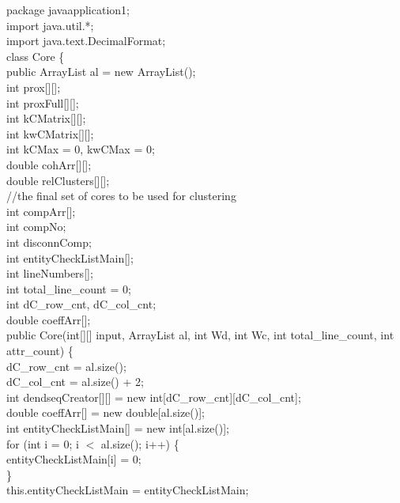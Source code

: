 \begin{ttfamily   }
\begin{scriptsize}

\noindent package javaapplication1;\\ 
import java.util.*;\\
import java.text.DecimalFormat;\\ 

\noindent class Core \{\\
    \noindent public ArrayList al = new ArrayList();\\
    int prox[][];\\
    int proxFull[][];\\
    int kCMatrix[][];\\
    int kwCMatrix[][];\\
    int kCMax = 0, kwCMax = 0;\\
    double cohArr[][];\\
    double relClusters[][];\\\noindent//the final set of cores to be used for clustering\\
    int compArr[];\\
    int compNo;\\
    int disconnComp;\\
    int entityCheckListMain[];\\
    int lineNumbers[];\\
    int total\_line\_count = 0;\\
    int dC\_row\_cnt, dC\_col\_cnt;\\
    double coeffArr[];\\

    \noindent public Core(int[][] input, ArrayList al, int Wd, int Wc, int total\_line\_count, int attr\_count) \{\\
         dC\_row\_cnt = al.size();\\
        dC\_col\_cnt = al.size() + 2;\\
        int dendseqCreator[][] = new int[dC\_row\_cnt][dC\_col\_cnt];\\
        double coeffArr[] = new double[al.size()];\\
        int entityCheckListMain[] = new int[al.size()];\\

        \noindent for (int i = 0;   i $<$ al.size();   i++) \{\\
            entityCheckListMain[i] = 0;\\
        \}\\
        this.entityCheckListMain = entityCheckListMain;\\


\end{scriptsize}
\end{ttfamily   }

